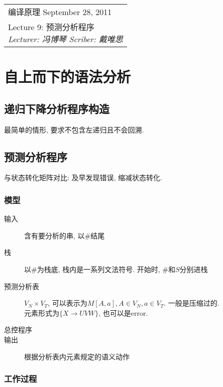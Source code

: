 \def\lecture{9}
\clearpage \noindent\begin{tabularx}{\linewidth}{|X|}
\hline \vskip -2mm
{\sf 编译原理} \hfill September 28, 2011 \\
{\centering \sf \large Lecture \lecture:
预测分析程序 \\ }
\textsl{Lecturer: 冯博琴 \hfill Scriber: 戴唯思}\\ \hline
\end{tabularx}
\setcounter{section}{0}
\renewcommand{\thepage}{\lecture -\arabic{page}}

\section{自上而下的语法分析}

    \subsection{递归下降分析程序构造}

        最简单的情形, 要求不包含左递归且不会回溯. 

    \subsection{预测分析程序}

        与状态转化矩阵对比: 及早发现错误, 缩减状态转化.

        \subsubsection{模型}

            \begin{description}
                \item[输入] 含有要分析的串, 以\#结尾
                \item[栈] 以\#为栈底, 栈内是一系列文法符号. 开始时, \#和$S$分别进栈
                \item[预测分析表] $V_N\times V_T$, 可以表示为$M[A,a], A\in V_N,a\in V_T$. 一般是压缩过的. \\
                    元素形式为$\{X\to UVW\}$, 也可以是error.
                \item[总控程序]
                \item[输出] 根据分析表内元素规定的语义动作
            \end{description}


        \subsubsection{工作过程}

